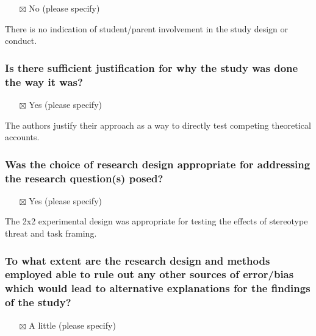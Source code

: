 \documentclass[
  doc, a4paper]{apa7}
\providecommand{\tightlist}{%
  \setlength{\itemsep}{0pt}\setlength{\parskip}{0pt}}
\begin{document}
\begin{itemize}
\tightlist
\item[$\boxtimes$]
  No (please specify)
\end{itemize}

There is no indication of student/parent involvement in the study design or conduct.

\subsubsection{Is there sufficient justification for why the study was done the way it was?}\label{is-there-sufficient-justification-for-why-the-study-was-done-the-way-it-was}

\begin{itemize}
\tightlist
\item[$\boxtimes$]
  Yes (please specify)
\end{itemize}

The authors justify their approach as a way to directly test competing theoretical accounts.

\subsubsection{Was the choice of research design appropriate for addressing the research question(s) posed?}\label{was-the-choice-of-research-design-appropriate-for-addressing-the-research-questions-posed}

\begin{itemize}
\tightlist
\item[$\boxtimes$]
  Yes (please specify)
\end{itemize}

The 2x2 experimental design was appropriate for testing the effects of stereotype threat and task framing.

\subsubsection{To what extent are the research design and methods employed able to rule out any other sources of error/bias which would lead to alternative explanations for the findings of the study?}\label{to-what-extent-are-the-research-design-and-methods-employed-able-to-rule-out-any-other-sources-of-errorbias-which-would-lead-to-alternative-explanations-for-the-findings-of-the-study}

\begin{itemize}
\tightlist
\item[$\boxtimes$]
  A little (please specify)
\end{itemize}
\end{document}
